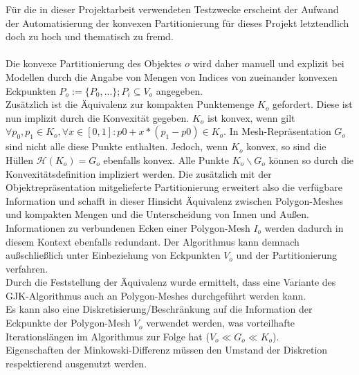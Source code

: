 Für die in dieser Projektarbeit verwendeten Testzwecke erscheint der Aufwand der Automatisierung der konvexen Partitionierung für dieses Projekt letztendlich doch zu hoch und thematisch zu fremd.\\
\ \\
Die konvexe Partitionierung des Objektes $o$ wird daher manuell und explizit bei Modellen durch die Angabe von Mengen von Indices von zueinander konvexen Eckpunkten $P_o := \{P_0, ...\}; P_i \subseteq V_o$ angegeben.\\
Zusätzlich ist die Äquivalenz zur kompakten Punktemenge $K_o$ gefordert. Diese ist nun implizit durch die Konvexität gegeben. $K_o$ ist konvex, wenn gilt $\forall p_0, p_1 \in K_o, \forall x \in [0,1] : p0 + x * (p_1 - p0) \in K_o $. In Mesh-Repräsentation $G_o$ sind nicht alle diese Punkte enthalten. Jedoch, wenn $K_o$ konvex, so sind die Hüllen $\mathcal{H}(K_o) = G_o$ ebenfalls konvex. Alle Punkte $K_o \backslash G_o$ können so durch die Konvexitätsdefinition impliziert werden. Die zusätzlich mit der Objektrepräsentation mitgelieferte Partitionierung erweitert also die verfügbare Information und schafft in dieser Hinsicht Äquivalenz zwischen Polygon-Meshes und kompakten Mengen und die Unterscheidung von Innen und Außen. Informationen zu verbundenen Ecken einer Polygon-Mesh $I_o$ werden dadurch in diesem Kontext ebenfalls redundant. Der Algorithmus kann demnach außschließlich unter Einbeziehung von Eckpunkten $V_o$ und der Partitionierung verfahren.\\
Durch die Feststellung der Äquivalenz wurde ermittelt, dass eine Variante des GJK-Algorithmus auch an Polygon-Meshes durchgeführt werden kann.\\
Es kann also eine Diskretisierung/Beschränkung auf die Information der Eckpunkte der Polygon-Mesh $V_o$  verwendet werden, was vorteilhafte Iterationslängen im Algorithmus zur Folge hat ($V_o \ll G_o \ll K_o$).\\
Eigenschaften der Minkowski-Differenz müssen den Umstand der Diskretion respektierend ausgenutzt werden.\\

